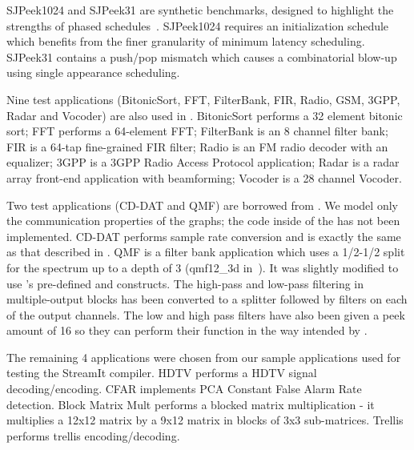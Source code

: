 \documentclass{sig-alt-full}
\begin{document}
SJPeek1024 and SJPeek31 are synthetic benchmarks, designed to
highlight the strengths of phased schedules~\cite{karczma-thesis}.
SJPeek1024 requires an initialization schedule which benefits from the
finer granularity of minimum latency scheduling. SJPeek31 contains a
push/pop mismatch which causes a combinatorial blow-up using single
appearance scheduling.

Nine test applications (BitonicSort, FFT, FilterBank, FIR, Radio, GSM,
3GPP, Radar and Vocoder) are also used in \cite{Gordo02}. BitonicSort
performs a 32 element bitonic sort; FFT performs a 64-element FFT;
FilterBank is an 8 channel filter bank; FIR is a 64-tap fine-grained
FIR filter; Radio is an FM radio decoder with an equalizer; 3GPP is a
3GPP Radio Access Protocol application; Radar is a radar array
front-end application with beamforming; Vocoder is a 28 channel
Vocoder.

Two test applications (CD-DAT and QMF) are borrowed from
\cite{murt2000x2}. We model only the communication properties of the
graphs; the code inside of the {\filters} has not been implemented.
CD-DAT performs sample rate conversion and is exactly the same as that
described in \cite{murt2000x2}.  QMF is a filter bank application
which uses a 1/2-1/2 split for the spectrum up to a depth of 3
(qmf12\_3d in~\cite{murt2000x2}).  It was slightly modified to use
{\StreamIt}'s pre-defined {\splitter} and {\joiner} constructs.  The
high-pass and low-pass filtering in multiple-output blocks has been
converted to a splitter followed by filters on each of the output
channels. The low and high pass filters have also been given a peek
amount of 16 so they can perform their function in the way intended by
{\StreamIt}.

The remaining 4 applications were chosen from our sample applications
used for testing the StreamIt compiler. HDTV performs a HDTV signal
decoding/encoding. CFAR implements PCA Constant False Alarm Rate
detection. Block Matrix Mult performs a blocked matrix multiplication
- it multiplies a 12x12 matrix by a 9x12 matrix in blocks of 3x3
sub-matrices. Trellis performs trellis encoding/decoding.

\begin{comment}

\subsection{Methodology}
\label{sec:results:methodology}

The following data has been collected: number of nodes, number of
node executions per steady state, schedule size and buffer size
for pseudo single appearance and minimal latency schedules.

\subsubsection{Schedule Compression}

\end{comment}
\end{document}
